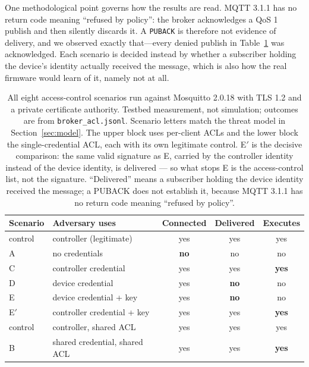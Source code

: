 One methodological point governs how the results are read. MQTT 3.1.1 has no return code
meaning ``refused by policy'': the broker acknowledges a QoS 1 publish and then silently
discards it. A \texttt{PUBACK} is therefore not evidence of delivery, and we observed exactly
that---every denied publish in Table~\ref{tab:broker} was acknowledged. Each scenario is
decided instead by whether a subscriber holding the device's identity actually received the
message, which is also how the real firmware would learn of it, namely not at all.

\begin{table}[htbp]
\centering\small
\caption{All eight access-control scenarios run against Mosquitto 2.0.18 with TLS 1.2 and a
private certificate authority. Testbed measurement, not simulation; outcomes are from
\texttt{broker\_acl.jsonl}. Scenario letters match the threat model in
Section~\ref{sec:model}. The upper block uses per-client ACLs and the lower block the
single-credential ACL, each with its own legitimate control. E$'$ is the decisive comparison:
the same valid signature as E, carried by the controller identity instead of the device
identity, is delivered --- so what stops E is the access-control list, not the signature.
``Delivered'' means a subscriber holding the device identity received the message; a PUBACK
does not establish it, because MQTT 3.1.1 has no return code meaning ``refused by policy''.}
\label{tab:broker}
\begin{tabular}{@{}llccc@{}}
\toprule
Scenario & Adversary uses & Connected & Delivered & Executes \\
\midrule
control & controller (legitimate) & yes & yes & yes \\
A & no credentials          & \textbf{no} & no  & no \\
C & controller credential   & yes & yes & \textbf{yes} \\
D & device credential       & yes & \textbf{no}  & no \\
E & device credential + key & yes & \textbf{no}  & no \\
E$'$ & controller credential + key & yes & yes & \textbf{yes} \\
\midrule
control & controller, shared ACL & yes & yes & yes \\
B & shared credential, shared ACL & yes & yes & \textbf{yes} \\
\bottomrule
\end{tabular}
\end{table}

